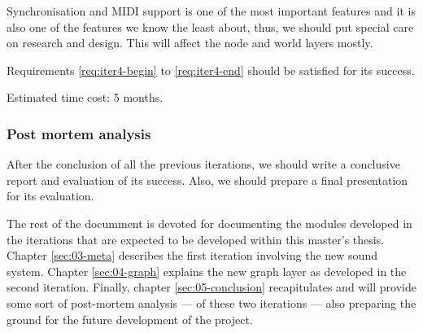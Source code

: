 Synchronisation and MIDI support is one of the most important
features and it is also one of the features we know the least about,
thus, we should put special care on research and design. This will
affect the node and world layers mostly.

Requirements \ref{req:iter4-begin} to \ref{req:iter4-end} should be
satisfied for its success.

Estimated time cost: 5 months.

\subsubsection{Post mortem analysis}

After the conclusion of all the previous iterations, we should write a
conclusive report and evaluation of its success. Also, we should
prepare a final presentation for its evaluation.

\begin{mynote}
  The rest of the documment is devoted for documenting the modules
  developed in the iterations that are expected to be developed within
  this master's thesis. Chapter \ref{sec:03-meta} describes the first
  iteration involving the new sound system. Chapter \ref{sec:04-graph}
  explains the new graph layer as developed in the second
  iteration. Finally, chapter \ref{sec:05-conclusion} recapitulates
  and will provide some sort of post-mortem analysis --- of these two
  iterations --- also preparing the ground for the future development
  of the project.
\end{mynote}

